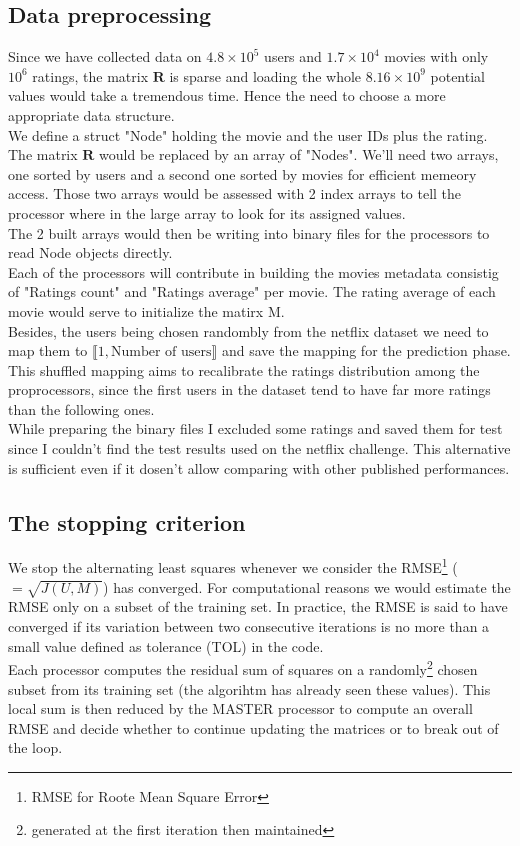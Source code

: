 \documentclass[10pt]{article}
\begin{document}
\subsection{Data preprocessing}
Since we have collected data on $4.8\times 10^5$ users and $1.7\times 10^4$ movies with only $10^6$ ratings, the matrix $\mathbf R$ is sparse and loading the whole $8.16\times 10^9$ potential values would take a tremendous time. Hence the need to choose a more appropriate data structure.\\
We define a struct "Node" holding the movie and the user IDs plus the rating. The matrix $\mathbf R$ would be replaced by an array of "Nodes". We'll need two arrays, one sorted by users and a second one sorted by movies for efficient memeory access. Those two arrays would be assessed with 2 index arrays to tell the processor where in the large array to look for its assigned values.\\
The 2 built arrays would then be writing into binary files for the processors to read Node objects directly.\\
Each of the processors will contribute in building the movies metadata consistig of "Ratings count" and "Ratings average" per movie. The rating average of each movie would serve to initialize the matirx M.\\
Besides, the users being chosen randombly from the netflix dataset we need to map them to $\llbracket 1 ,\text{Number of users}\rrbracket$ and save the mapping for the prediction phase. This shuffled mapping aims to recalibrate the ratings distribution among the proprocessors, since the first users in the dataset tend to have far more ratings than the following ones.\\
While preparing the binary files I excluded some ratings and saved them for test since I couldn't find the test results used on the netflix challenge. This alternative is sufficient even if it dosen't allow comparing with other published performances.

\subsection{The stopping criterion}
We stop the alternating least squares whenever we consider the RMSE\footnote{RMSE for Roote Mean Square Error} ($=\sqrt{J(U,M)}$) has converged. For computational reasons we would estimate the RMSE only on a subset of the training set. In practice, the RMSE is said to have converged if its variation between two consecutive iterations is no more than a small value defined as tolerance (TOL) in the code.\\
Each processor computes the residual sum of squares on a randomly\footnote{generated at the first iteration then maintained} chosen subset from its training set (the algorihtm has already seen these values). This local sum is then reduced by the MASTER processor to compute an overall RMSE and decide whether to continue updating the matrices or to break out of the loop.
\end{document}
